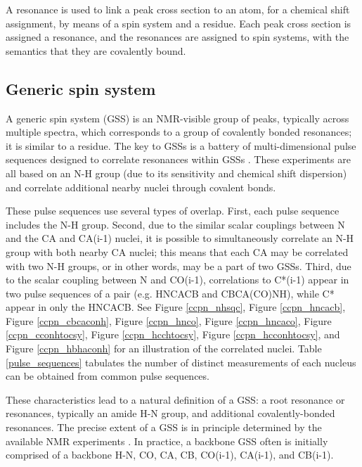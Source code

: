 A resonance is used to link a peak cross section to an atom, for a chemical shift
assignment, by means of a spin system and a residue.  Each peak cross section is
assigned a resonance, and the resonances are assigned to spin systems, with
the semantics that they are covalently bound.

\subsection{Generic spin system}
A generic spin system (GSS) is an NMR-visible group of peaks, typically 
across multiple spectra, which corresponds to a group of covalently bonded 
resonances; it is similar to a residue.  
The key to GSSs is a battery of multi-dimensional pulse 
sequences designed to correlate resonances within GSSs 
\cite{cavanagh1995protein, hncacb, hnco, cbcaconh}.  These experiments are all
based on an N-H group (due to its sensitivity and chemical shift dispersion)
and correlate additional nearby nuclei through covalent bonds.

These pulse sequences use several types of overlap.  First, each pulse sequence
includes the N-H group.  Second, due to the similar scalar couplings between
N and the CA and CA(i-1) nuclei, it is possible to simultaneously correlate an
N-H group with both nearby CA nuclei; this means that each CA may be correlated
with two N-H groups, or in other words, may be a part of two GSSs. 
Third, due to the scalar coupling between N and CO(i-1), correlations to 
C*(i-1) appear in two pulse sequences of a pair (e.g. HNCACB and CBCA(CO)NH), 
while C* appear in only the HNCACB.  See Figure \ref{ccpn_nhsqc}, 
Figure \ref{ccpn_hncacb}, Figure \ref{ccpn_cbcaconh}, Figure \ref{ccpn_hnco}, 
Figure \ref{ccpn_hncaco}, Figure \ref{ccpn_cconhtocsy}, Figure \ref{ccpn_hcchtocsy},
Figure \ref{ccpn_hcconhtocsy}, and Figure \ref{ccpn_hbhaconh} for an 
illustration of the correlated nuclei.  Table \ref{pulse_sequences} tabulates
the number of distinct measurements of each nucleus can be obtained from
common pulse sequences.

These characteristics lead to a natural definition of a GSS: a root 
resonance or resonances, typically an amide H-N group, and additional 
covalently-bonded resonances.  The precise extent of a GSS is in principle 
determined by the available NMR experiments \cite{hncacb, hnco, cbcaconh}.  
In practice, a backbone GSS often is initially 
comprised of a backbone H-N, CO, CA, CB, CO(i-1), CA(i-1), and CB(i-1).  



